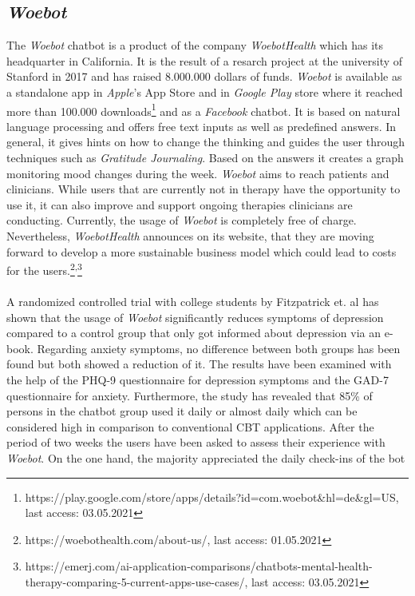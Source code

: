 \documentclass[sigconf, nonacm]{acmart}
\begin{document}
\subsection{\emph{Woebot}}
\label{sec:two_one}
The \emph{Woebot} chatbot is a product of the company \emph{WoebotHealth} which has its headquarter in California. It is the result of a resarch 
project at the university of Stanford in 2017 and has raised 8.000.000 dollars of funds.
\emph{Woebot} is available as a standalone app in \emph{Apple}'s App Store and in \emph{Google Play} store where it reached more than 100.000 downloads\footnote{https://play.google.com/store/apps/details?id=com.woebot\&hl=de\&gl=US, last access: 03.05.2021} and as 
a \emph{Facebook} chatbot. It is based on natural language processing and offers free text inputs as well as predefined answers.
In general, it gives hints on how to change the thinking and guides the user through techniques such as \emph{Gratitude Journaling}. 
Based on the answers it creates a graph monitoring mood changes during the week.
\emph{Woebot} aims to reach patients and clinicians. While users that are currently not in therapy have the opportunity to use it,
it can also improve and support ongoing therapies clinicians are conducting.
Currently, the usage of \emph{Woebot} is completely free of charge. Nevertheless, \emph{WoebotHealth} announces on its website, that they are moving forward
to develop a more sustainable business model which could lead to costs for the users.\footnote{https://woebothealth.com/about-us/, last access: 01.05.2021}\textsuperscript{,}\footnote{https://emerj.com/ai-application-comparisons/chatbots-mental-health-therapy-comparing-5-current-apps-use-cases/, last access: 03.05.2021}
\\\\
A randomized controlled trial with college students by Fitzpatrick et. al \cite{Fitzpatrick2017} has shown that the usage of \emph{Woebot} significantly reduces
symptoms of depression compared to a control group that only got informed about depression via an e-book. Regarding anxiety symptoms, no difference between
both groups has been found but both showed a reduction of it. The results have been examined with the help of the PHQ-9 questionnaire for depression symptoms and the GAD-7 questionnaire for anxiety. Furthermore, the study has revealed that 85\% of persons in the chatbot group used 
it daily or almost daily which can be considered high in comparison to conventional CBT applications\cite{Ludden2015}.
After the period of two weeks the users have been asked to assess their experience with \emph{Woebot}. On the one hand, the majority appreciated the daily check-ins of the bot 
\end{document}
